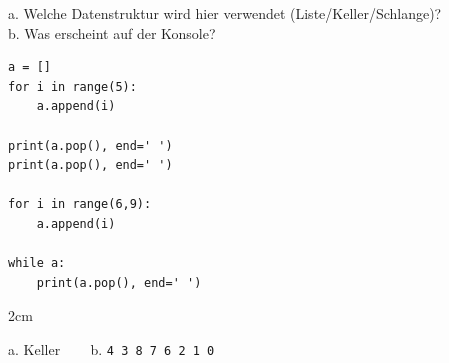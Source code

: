 \question[2]
a. Welche Datenstruktur wird hier verwendet (Liste/Keller/Schlange)? \\
b. Was erscheint auf der Konsole?
 
\begin{lstlisting}
a = []
for i in range(5):
    a.append(i)

print(a.pop(), end=' ')
print(a.pop(), end=' ')

for i in range(6,9):
    a.append(i)

while a:
    print(a.pop(), end=' ')
\end{lstlisting}

\begin{solutionbox}{2cm}
 
a. Keller ~~~ b. \texttt{4 3 8 7 6 2 1 0}
\end{solutionbox}
